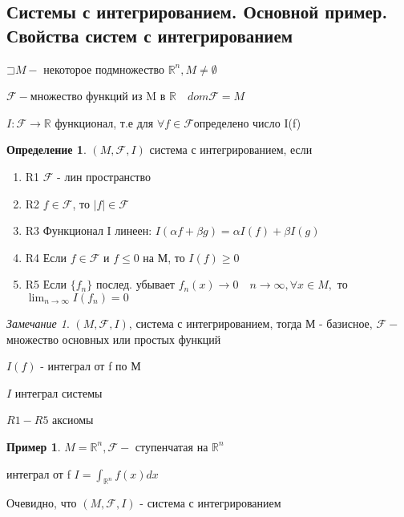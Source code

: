\documentclass[a4paper]{article}
\newcommand\letsymbol{\mathord{\sqsupset}}
\theoremstyle{definition}
\newtheorem*{example}{Пример}
\newtheorem*{definition}{Определение}
\theoremstyle{remark}
\newtheorem*{remark}{Замечание}
\begin{document}
    \subsection{ Системы с интегрированием. Основной пример. Свойства систем с интегрированием}
    $\letsymbol{} M -$ некоторое подмножество $\mathbb{R} ^n, M\neq\emptyset$

$\mathcal{F} - $множество функций из M в $\mathbb{R} \quad dom{\mathcal{F} } = M$

$I:\mathcal{F} \to \mathbb{R} $ функционал, т.е для $\forall f\in \mathcal{F} $определено число I(f)
\begin{definition}
     $(M, \mathcal{F} , I)$ система с интегрированием, если
     \begin{enumerate}
          \item{R1} $\mathcal{F} $ - лин пространство
          \item{R2} $f\in\mathcal{F}$, то $|f|\in \mathcal{F} $
          \item{R3} Функционал I линеен: $I(\alpha f + \beta g) = \alpha I(f)+\beta I(g)$
          \item{R4} Если $f\in \mathcal{F} $ и $f\leq0$ на М, то $I(f)\geq0$
          \item{R5} Если $\{f_n\}$ послед. убывает $f_n(x)\to0\quad n\to\infty, \forall x\in M,$ то $\lim_{n\to\infty}I(f_n) = 0$ 
     \end{enumerate}
\end{definition}
\begin{remark}
     $(M, \mathcal{F} , I)$, система с интегрированием, тогда М - базисное, $\mathcal{F} -$ множество
     основных или простых функций

     $I(f)$ - интеграл от f по М

     $I$ интеграл системы
     
     $R1-R5$ аксиомы
\end{remark}
\begin{example}
     $M = \mathbb{R} ^n, \mathcal{F} -$ ступенчатая на $\mathbb{R} ^n$

     интеграл от f $I = \int_{\mathbb{R} ^n}f(x)dx$

     Очевидно, что $(M, \mathcal{F} , I)$ - система с интегрированием
\end{example}
\end{document}

